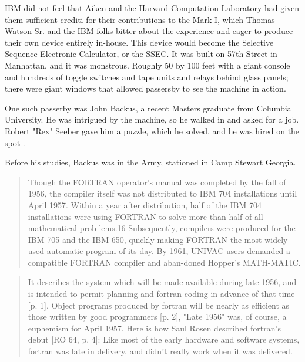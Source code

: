 IBM did not feel that Aiken and the Harvard Computation Laboratory had
given them sufficient crediti for their contributions to the Mark I,
which Thomas Watson Sr. and the IBM folks bitter about the experience
and eager to produce their own device entirely in-house.
This device would become the Selective Sequence Electronic Calculator, or the SSEC.
It was built on 57th Street in Manhattan, and it was monstrous.
Roughly 50 by 100 feet with a giant console and hundreds of toggle switches and
tape units and relays behind glass panels; there were giant windows that allowed
passersby to see the machine in action.

One such passerby was John Backus, a recent Masters graduate from Columbia University.
He was intrigued by the machine, so he walked in and asked for a job.
Robert "Rex" Seeber gave him a puzzle, which he solved, and he was hired on the spot
\cite{backus_oral_history_2006}.

Before his studies, Backus was in the Army, stationed in Camp Stewart Georgia.


\begin{quotation}
Though the FORTRAN operator's manual was completed by the fall of 1956, the 
compiler itself was not distributed to IBM 704 installations until April 1957. 
Within a year after distribution, half of the IBM 704 installations were using 
FORTRAN to solve more than half of all mathematical prob-lems.16 Subsequently, 
compilers were produced for the IBM 705 and the IBM 650, quickly making FORTRAN 
the most widely used automatic program of its day. By 1961, UNIVAC users 
demanded a compatible FORTRAN compiler and aban-doned Hopper's MATH-MATIC.
\cite{grace_hopper_and_the_invention_of_the_information_age_2009}
\end{quotation}

\begin{quotation}
It describes the system which will be made available during late 1956, and is 
intended to permit planning and fortran coding in advance of that time [p. 1], 
Object programs produced by fortran will be nearly as efficient as those 
written by good programmers [p. 2], "Late 1956" was, of course, a euphemism for 
April 1957. Here is how Saul Rosen described fortran's debut [RO 64, p. 4]: Like 
most of the early hardware and software systems, fortran was late in delivery, 
and didn't really work when it was delivered.
\cite{history_of_computing_in_the_twentieth_century_1980}
\end{quotation}

